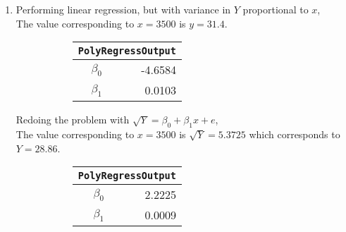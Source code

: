 \begin{enumerate}
\item Performing linear regression, but with variance in $ Y $ proportional to $ x $, \\
The value corresponding to $ x = 3500 $ is $ y = 31.4 $.\\

\begin{figure}[H]
	\begin{subfigure}[]{0.2\linewidth}
		\centering
		\begin{tabular}{@{}rr@{}}
			\toprule
			\multicolumn{2}{c}{\texttt{PolyRegressOutput}} \\
			\midrule
			$\beta_0$ &          -4.6584 \\
			$\beta_1$ &           0.0103 \\
			\bottomrule
		\end{tabular}
		
	\end{subfigure}
	\begin{subfigure}[]{0.8\linewidth}
		\centering
		
	\end{subfigure}
\end{figure}

Redoing the problem with $ \sqrt{Y} = \beta_0 + \beta_1 x + e $,\\
The value corresponding to $ x = 3500 $ is $ \sqrt{Y} = 5.3725 $ which corresponds to $ Y = 28.86 $.\\

\begin{figure}[H]
	\begin{subfigure}[]{0.2\linewidth}
		\centering
		\begin{tabular}{@{}rr@{}}
			\toprule
			\multicolumn{2}{c}{\texttt{PolyRegressOutput}} \\
			\midrule
			$\beta_0$ &           2.2225 \\
			$\beta_1$ &           0.0009 \\
			\bottomrule
		\end{tabular}
		

\end{subfigure}
\end{figure}
\end{enumerate}
